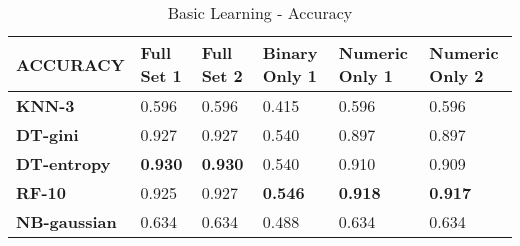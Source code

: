 \documentclass[10pt, conference, compsocconf]{IEEEtran}
\begin{document}
\begin{center}
	\begin{table}[t]
		\centering \footnotesize
		\vspace{0.01cm}
		\caption{Basic Learning - Accuracy}
		\hspace{1cm}
		\begin{tabularx}{\linewidth}{ l  X  X  X  X  X }
			\hline
			\textbf{ACCURACY} &	\textbf{Full Set 1}&	\textbf{Full Set 2}&	\textbf{Binary Only 1}&	\textbf{Numeric Only 1}&	\textbf{Numeric Only 2} \\ \hline
			
			
			\textbf{KNN-3}&	0.596&	0.596&	0.415&	0.596&	0.596\\ \hline
			\textbf{DT-gini}&	0.927&	0.927&	0.540&	0.897&	0.897\\ \hline
			\textbf{DT-entropy}&	\textbf{0.930}&	\textbf{0.930}&	0.540&	0.910&	0.909\\ \hline
			\textbf{RF-10}&	0.925&	0.927&	\textbf{0.546}&	\textbf{0.918}&	\textbf{0.917}\\ \hline
			\textbf{NB-gaussian}&	0.634&	0.634&	0.488&	0.634&	0.634\\ \hline
			
					
		\end{tabularx}\newline
		\vspace{-0.05cm}
		\label{Table1}
	\end{table} \hfil
\end{center}
\end{document}
